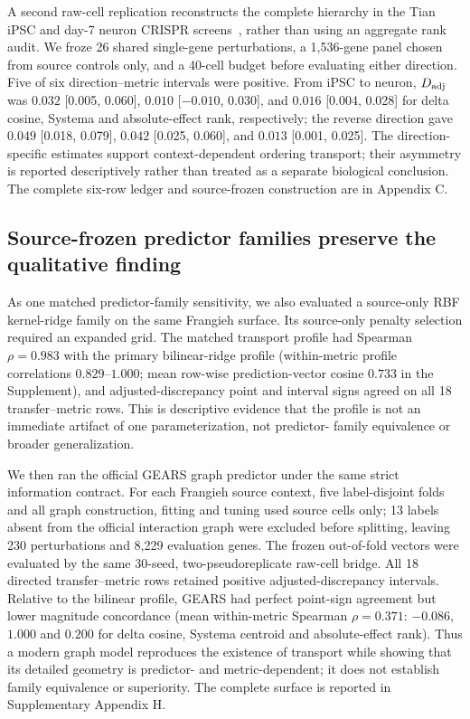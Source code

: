 \documentclass{article}
\begin{document}
A second raw-cell replication reconstructs the complete hierarchy in the Tian
iPSC and day-7 neuron CRISPR screens~\citep{tian2019crispri}, rather than using an aggregate rank
audit. We froze 26 shared single-gene perturbations, a 1,536-gene panel chosen
from source controls only, and a 40-cell budget before evaluating either
direction. Five of six direction--metric intervals were positive. From iPSC
to neuron, $D_{\rm adj}$ was $0.032$ [0.005, 0.060], $0.010$
[$-0.010$, 0.030], and $0.016$ [0.004, 0.028] for delta cosine, Systema and
absolute-effect rank, respectively; the reverse direction gave $0.049$
[0.018, 0.079], $0.042$ [0.025, 0.060], and $0.013$ [0.001, 0.025]. The
direction-specific estimates support context-dependent ordering transport;
their asymmetry is reported descriptively rather than treated as a separate
biological conclusion.
The complete six-row ledger and source-frozen construction are in Appendix C.

\subsection{Source-frozen predictor families preserve the qualitative finding}
As one matched predictor-family sensitivity, we also evaluated a source-only
RBF kernel-ridge family on the same Frangieh surface. Its source-only penalty
selection required an expanded grid. The matched transport profile had
Spearman $\rho=0.983$ with the primary bilinear-ridge profile (within-metric
profile correlations $0.829$--$1.000$; mean row-wise prediction-vector cosine
$0.733$ in the Supplement), and adjusted-discrepancy point and interval signs
agreed on all 18 transfer--metric rows. This is descriptive evidence that the
profile is not an immediate artifact of one parameterization, not predictor-
family equivalence or broader generalization.

We then ran the official GEARS graph predictor under the same strict
information contract. For each Frangieh source context, five label-disjoint
folds and all graph construction, fitting and tuning used source cells only;
13 labels absent from the official interaction graph were excluded before
splitting, leaving 230 perturbations and 8,229 evaluation genes. The frozen
out-of-fold vectors were evaluated by the same 30-seed, two-pseudoreplicate
raw-cell bridge. All 18 directed transfer--metric rows retained positive
adjusted-discrepancy intervals. Relative to the bilinear profile, GEARS had
perfect point-sign agreement but lower magnitude concordance (mean
within-metric Spearman $\rho=0.371$: $-0.086$, $1.000$ and $0.200$ for delta
cosine, Systema centroid and absolute-effect rank). Thus a modern graph model
reproduces the existence of transport while showing that its detailed geometry
is predictor- and metric-dependent; it does not establish family equivalence
or superiority. The complete surface is reported in Supplementary Appendix H.
\end{document}
